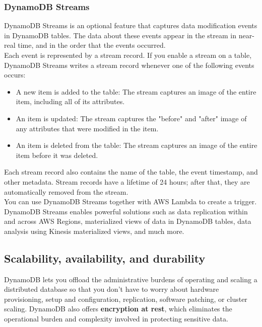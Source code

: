 \documentclass[12pt, letterpaper, twoside]{article}
\begin{document}
\subsubsection{DynamoDB Streams}
DynamoDB Streams is an optional feature that captures data modification events in DynamoDB tables. The data about 
these events appear in the stream in near-real time, and in the order that the events occurred.\\

Each event is represented by a stream record. If you enable a stream on a table, DynamoDB Streams writes a stream 
record whenever one of the following events occurs:

\begin{itemize}
	\item A new item is added to the table: The stream captures an image of the entire item, including all of its attributes.

	\item An item is updated: The stream captures the "before" and "after" image of any attributes that were modified in the item.

	\item An item is deleted from the table: The stream captures an image of the entire item before it was deleted.
\end{itemize}

Each stream record also contains the name of the table, the event timestamp, and other metadata. Stream records 
have a lifetime of 24 hours; after that, they are automatically removed from the stream.\\

You can use DynamoDB Streams together with AWS Lambda to create a trigger.\\
DynamoDB Streams enables powerful solutions such as data replication within and across AWS Regions, materialized 
views of data in DynamoDB tables, data analysis using Kinesis materialized views, and much more.\\

\subsection{Scalability, availability, and durability}
DynamoDB lets you offload the administrative burdens of operating and scaling a distributed database so that you 
don't have to worry about hardware provisioning, setup and configuration, replication, software patching, or cluster 
scaling. DynamoDB also offers \textbf{encryption at rest}, which eliminates the operational burden and complexity involved in 
protecting sensitive data.\\
\end{document}
